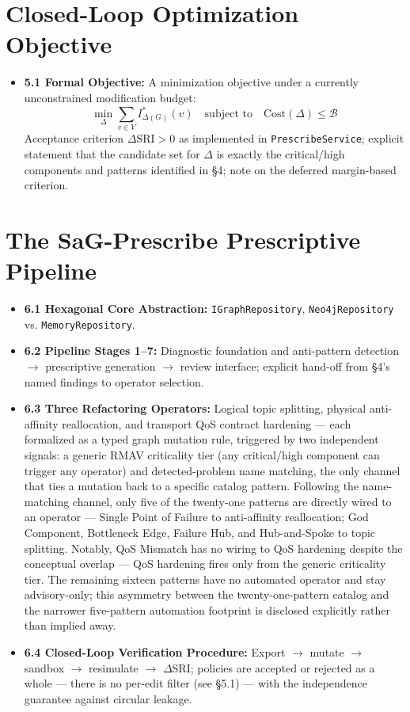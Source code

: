 \documentclass[11pt]{article}
\begin{document}
\section{Closed-Loop Optimization Objective}

\begin{itemize}[leftmargin=*]
\item \textbf{5.1 Formal Objective:} A minimization objective under a currently unconstrained
  modification budget:
  \begin{equation*}
  \min_{\Delta} \sum_{v \in V} I^*_{\Delta(G)}(v) \quad \text{subject to} \quad \mathrm{Cost}(\Delta)
  \le \mathcal{B}
  \end{equation*}
  Acceptance criterion $\Delta\mathrm{SRI}>0$ as implemented in \texttt{PrescribeService}; explicit
  statement that the candidate set for $\Delta$ is exactly the critical/high components and patterns
  identified in \S4; note on the deferred margin-based criterion.
\end{itemize}

\section{The SaG-Prescribe Prescriptive Pipeline}

\begin{itemize}[leftmargin=*]
\item \textbf{6.1 Hexagonal Core Abstraction:} \texttt{IGraphRepository}, \texttt{Neo4jRepository}
  vs. \texttt{MemoryRepository}.
\item \textbf{6.2 Pipeline Stages 1--7:} Diagnostic foundation and anti-pattern detection $\to$
  prescriptive generation $\to$ review interface; explicit hand-off from \S4's named findings to
  operator selection.
\item \textbf{6.3 Three Refactoring Operators:} Logical topic splitting, physical anti-affinity
  reallocation, and transport QoS contract hardening --- each formalized as a typed graph mutation
  rule, triggered by two independent signals: a generic RMAV criticality tier (any critical/high
  component can trigger any operator) and detected-problem name matching, the only channel that ties
  a mutation back to a specific catalog pattern. Following the name-matching channel, only five of
  the twenty-one patterns are directly wired to an operator --- Single Point of Failure to
  anti-affinity reallocation; God Component, Bottleneck Edge, Failure Hub, and Hub-and-Spoke to topic
  splitting. Notably, QoS Mismatch has no wiring to QoS hardening despite the conceptual overlap ---
  QoS hardening fires only from the generic criticality tier. The remaining sixteen patterns have no
  automated operator and stay advisory-only; this asymmetry between the twenty-one-pattern catalog
  and the narrower five-pattern automation footprint is disclosed explicitly rather than implied
  away.
\item \textbf{6.4 Closed-Loop Verification Procedure:} Export $\to$ mutate $\to$ sandbox $\to$
  resimulate $\to$ $\Delta$SRI; policies are accepted or rejected as a whole --- there is no per-edit
  filter (see \S5.1) --- with the independence guarantee against circular leakage.
\end{itemize}
\end{document}
